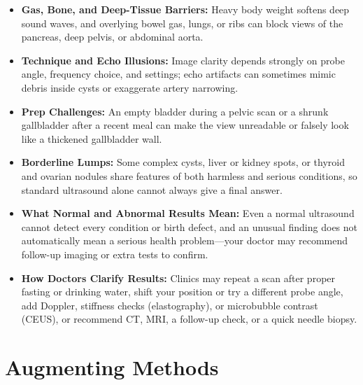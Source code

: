 \begin{itemize}
    \item \textbf{Gas, Bone, and Deep-Tissue Barriers:} Heavy body weight softens deep sound waves, and overlying bowel gas, lungs, or ribs can block views of the pancreas, deep pelvis, or abdominal aorta.
    \item \textbf{Technique and Echo Illusions:} Image clarity depends strongly on probe angle, frequency choice, and settings; echo artifacts can sometimes mimic debris inside cysts or exaggerate artery narrowing.
    \item \textbf{Prep Challenges:} An empty bladder during a pelvic scan or a shrunk gallbladder after a recent meal can make the view unreadable or falsely look like a thickened gallbladder wall.
    \item \textbf{Borderline Lumps:} Some complex cysts, liver or kidney spots, or thyroid and ovarian nodules share features of both harmless and serious conditions, so standard ultrasound alone cannot always give a final answer.
    \item \textbf{What Normal and Abnormal Results Mean:} Even a normal ultrasound cannot detect every condition or birth defect, and an unusual finding does not automatically mean a serious health problem---your doctor may recommend follow-up imaging or extra tests to confirm.
    \item \textbf{How Doctors Clarify Results:} Clinics may repeat a scan after proper fasting or drinking water, shift your position or try a different probe angle, add Doppler, stiffness checks (elastography), or microbubble contrast (CEUS), or recommend CT, MRI, a follow-up check, or a quick needle biopsy.
\end{itemize}

\section{Augmenting Methods}

